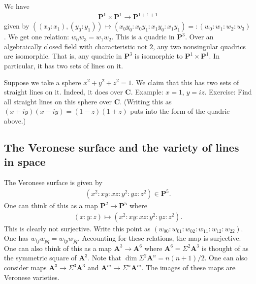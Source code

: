 \documentclass [11 pt, oneside, margin = 1 in] {article}
\begin{document}
\begin{example}\label{seg}\text{}
We have
\begin{align*}
	\mathbf{P}^1\times \mathbf{P}^1\longrightarrow \mathbf{P}^{1+1+1}
\end{align*}
given by $((x_0:x_1), (y_0:y_1)) \longmapsto (x_0y_0:x_0y_1: x_1y_0: x_1y_1) =:(w_0:w_1:w_2:w_3)$. We get one relation: $w_0w_3=w_1w_2$. This is a quadric in $\mathbf{P}^3$. Over an algebraically closed field with characteristic not $2$, any two nonsingular quadrics are isomorphic. That is, any quadric in $\mathbf{P}^3$ is isomorphic to $\mathbf{P}^1\times \mathbf{P}^1$. In particular, it has two sets of lines on it. 

Suppose we take a sphere $x^2+y^2+z^2=1$. We claim that this has two sets of straight lines on it. Indeed, it does over $\mathbf{C}$. Example: $x=1$, $y=iz$. Exercise: Find all straight lines on this sphere over $\mathbf{C}$. (Writing this as $(x+iy) (x-iy)= (1-z) (1+z)$ puts into the form of the quadric above.)
\end{example}

\subsection{The Veronese surface and the variety of lines in space}
\begin{example}\label{}\text{}
 The Veronese surface is given by
\begin{align*}
	(x^2:xy:xz:y^2:yz:z^2)\in  \mathbf{P}^5.
\end{align*}
One can think of this as a map $\mathbf{P}^2\longrightarrow \mathbf{P}^5$ where
\begin{align*}
	(x:y:z) \longmapsto (x^2:xy:xz:y^2:yz:z^2).	
\end{align*}
This is clearly not surjective. Write this point as $(w_{00}:w_{01}:w_{02}:w_{11}:w_{12}:w_{22})$. One has $w_{ij}w_{pq} = w_{ip}w_{jq}$. Accounting for these relations, the map is surjective. One can also think of this as a map $\mathbf{A}^3\longrightarrow \mathbf{A}^6$ where $\mathbf{A}^6 = \Sigma^2\mathbf{A}^3$ is thought of as the symmetric square of $\mathbf{A}^3$. Note that $\dim \Sigma^2\mathbf{A}^n = n(n+1)/2$. One can also consider maps $\mathbf{A}^3\longrightarrow \Sigma^3 \mathbf{A}^3$ and $\mathbf{A}^m \longrightarrow \Sigma^n \mathbf{A}^m$. The images of these maps are Veronese varieties.
\end{example}
\end{document}
